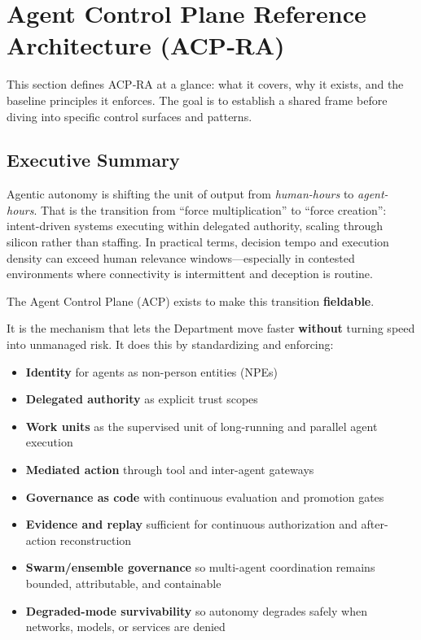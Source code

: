 \documentclass[11pt]{article}
\begin{document}
\hypertarget{agent-control-plane-reference-architecture-acpra}{%
\section{Agent Control Plane Reference Architecture (ACP‑RA)}\label{agent-control-plane-reference-architecture-acpra}}

This section defines ACP‑RA at a glance: what it covers, why it exists,
and the baseline principles it enforces. The goal is to establish a
shared frame before diving into specific control surfaces and patterns.

\hypertarget{executive-summary}{%
\subsection{Executive Summary}\label{executive-summary}}

Agentic autonomy is shifting the unit of output from \emph{human-hours}
to \emph{agent-hours}. That is the transition from ``force
multiplication'' to ``force creation'': intent-driven systems executing
within delegated authority, scaling through silicon rather than
staffing. In practical terms, decision tempo and execution density can
exceed human relevance windows---especially in contested environments
where connectivity is intermittent and deception is routine.

The Agent Control Plane (ACP) exists to make this transition
\textbf{fieldable}.

It is the mechanism that lets the Department move faster
\textbf{without} turning speed into unmanaged risk. It does this by
standardizing and enforcing:

\begin{itemize}
\tightlist
\item
  \textbf{Identity} for agents as non-person entities (NPEs)
\item
  \textbf{Delegated authority} as explicit trust scopes
\item
  \textbf{Work units} as the supervised unit of long-running and
  parallel agent execution
\item
  \textbf{Mediated action} through tool and inter-agent gateways
\item
  \textbf{Governance as code} with continuous evaluation and promotion
  gates
\item
  \textbf{Evidence and replay} sufficient for continuous authorization
  and after-action reconstruction
\item
  \textbf{Swarm/ensemble governance} so multi-agent coordination remains
  bounded, attributable, and containable
\item
  \textbf{Degraded-mode survivability} so autonomy degrades safely when
  networks, models, or services are denied
\end{itemize}
\end{document}
